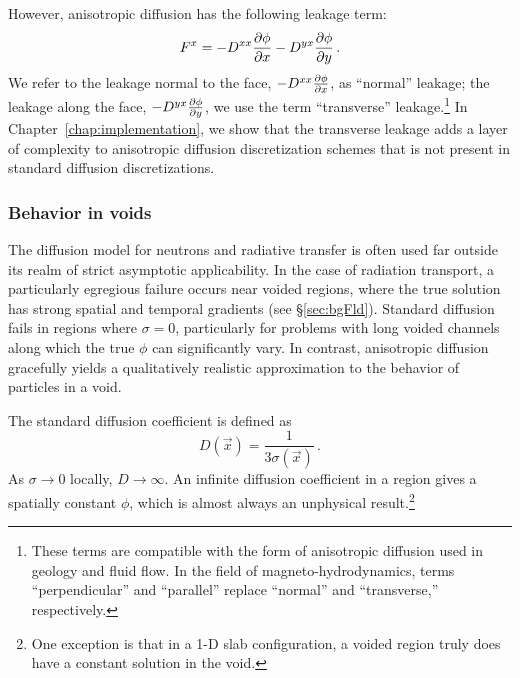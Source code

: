 However, anisotropic diffusion has the following leakage term:
\begin{equation*}
  F^x = - D^{xx} \frac{\partial \phi}{\partial x} - D^{yx} \frac{\partial \phi}{\partial y}\,.
\end{equation*}
We refer to the leakage normal to the face, $- D^{xx} \frac{\partial \phi}{\partial x}$, as
``normal'' leakage; the leakage along the face, $- D^{yx}
\frac{\partial \phi}{\partial y}$, we use the term ``transverse'' leakage.\footnote{%
These terms are compatible with the form of anisotropic diffusion used in
geology and fluid flow. In the field of magneto-hydrodynamics, terms
``perpendicular'' and ``parallel'' replace ``normal'' and ``transverse,''
respectively.
}
In Chapter~\ref{chap:implementation}, we show that the transverse leakage adds a
layer of
complexity to anisotropic diffusion discretization schemes that is not present
in standard diffusion discretizations.

\subsubsection{Behavior in voids}\label{sec:adVoids}

The diffusion model for neutrons and radiative transfer is often used far
outside its realm of strict asymptotic applicability. In the case of radiation
transport, a particularly egregious failure occurs near voided regions, where
the true solution has strong spatial and temporal gradients (see
\S\ref{sec:bgFld}). Standard diffusion fails in regions where $\sigma=0$,
particularly for problems with long voided channels along which the true $\phi$
can significantly vary.
In contrast, anisotropic diffusion gracefully yields a qualitatively realistic
approximation to the behavior of particles in a void.

The standard diffusion coefficient is defined as
\begin{equation*}
  D(\vec{x}) = \frac{1}{3\sigma(\vec{x})} \,.
\end{equation*}
As $\sigma\to0$ locally, $D\to \infty$. An infinite diffusion coefficient in a
region gives a spatially constant $\phi$, which is almost always an
unphysical result.\footnote{%
One exception is that in a 1-D slab configuration, a voided region truly does
have a constant solution in the void.}

